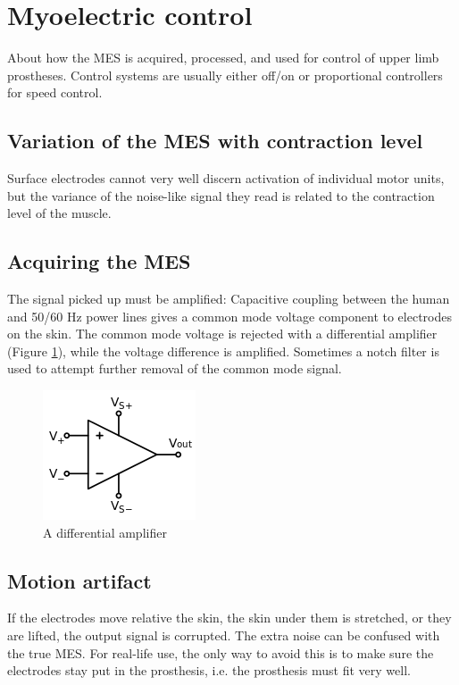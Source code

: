 \section{Myoelectric control}
About how the MES is acquired, processed, and used for control of upper limb prostheses. Control systems are usually either off/on or proportional controllers for speed control.

\subsection{Variation of the MES with contraction level}
Surface electrodes cannot very well discern activation of individual motor units, but the variance of the noise-like signal they read is related to the contraction level of the muscle.

\subsection{Acquiring the MES}
The signal picked up must be amplified: Capacitive coupling between the human and 50/60 Hz power lines gives a common mode voltage component to electrodes on the skin. The common mode voltage is rejected with a differential amplifier (Figure \ref{fig:diff-amp}), while the voltage difference is amplified. Sometimes a notch filter is used to attempt further removal of the common mode signal.

\begin{figure}[htbp]
    \centering
    \includegraphics[width=.5\linewidth]{img/op-amp}
    \caption{A differential amplifier}
    \label{fig:diff-amp}
\end{figure}

\subsection{Motion artifact}
If the electrodes move relative the skin, the skin under them is stretched, or they are lifted, the output signal is corrupted. The extra noise can be confused with the true MES. For real-life use, the only way to avoid this is to make sure the electrodes stay put in the prosthesis, i.e. the prosthesis must fit very well.


